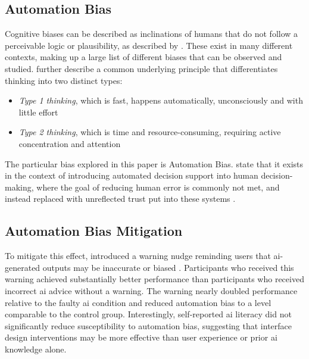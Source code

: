 \documentclass[sigconf,natbib=false]{acmart}
\begin{document}
\subsection{Automation Bias}
Cognitive biases can be described as inclinations of humans that do not follow a perceivable logic or plausibility, as described by \citeauthor*{korteling2022cognitive} \autocite[]{korteling2022cognitive}.
These exist in many different contexts, making up a large list of different biases that can be observed and studied.
\citeauthor*{korteling2022cognitive} further describe a common underlying principle that differentiates thinking into two distinct types:
\begin{itemize}
    \item \textit{Type 1 thinking}, which is fast, happens automatically, unconsciously and with little effort
    \item \textit{Type 2 thinking}, which is time and resource-consuming, requiring active concentration and attention
\end{itemize}
The particular bias explored in this paper is Automation Bias.
\citeauthor*{skitka_auto_bias} state that it exists in the context of introducing automated decision support into human decision-making, where the goal of reducing human error is commonly not met, and instead replaced with unreflected trust put into these systems \autocite[]{skitka_auto_bias}.



\subsection{Automation Bias Mitigation}
To mitigate this effect, \citeauthor[]{wingerter_mitigating_2025} introduced a warning nudge reminding users that \gls{ai}-generated outputs may be inaccurate or biased \autocite[]{wingerter_mitigating_2025}.
Participants who received this warning achieved substantially better performance than participants who received incorrect \gls{ai} advice without a warning.
The warning nearly doubled performance relative to the faulty \gls{ai} condition and reduced automation bias to a level comparable to the control group.
Interestingly, self-reported \Gls{ai} literacy did not significantly reduce susceptibility to automation bias, suggesting that interface design interventions may be more effective than user experience or prior \Gls{ai} knowledge alone.  \autocite[]{wingerter_mitigating_2025}
\end{document}
